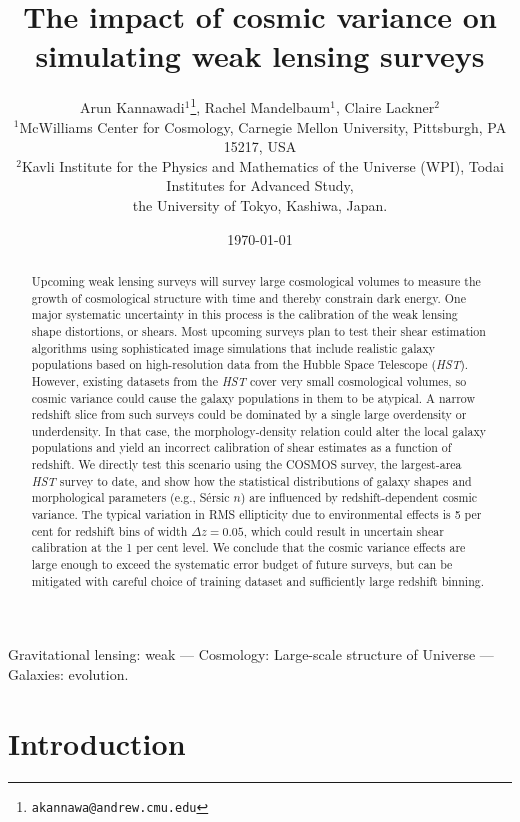 \documentclass[twocolumn,useAMS,usenatbib]{mn2e}
\title[Cosmic variance in simulations]{The impact of cosmic variance on simulating weak lensing surveys}
\author[Kannawadi et al.]
{Arun Kannawadi$^1$\thanks{\tt akannawa@andrew.cmu.edu}, 
Rachel Mandelbaum$^1$,
Claire Lackner$^2$
\\$^1$McWilliams Center for Cosmology, Carnegie Mellon University, Pittsburgh, PA 15217, USA
\\$^2$Kavli Institute for the Physics and Mathematics of the Universe (WPI), Todai Institutes for Advanced Study,\\ the University of Tokyo, Kashiwa, Japan.
}
\date{\today}
\begin{document}

\maketitle

\begin{abstract}
Upcoming weak lensing surveys will survey large cosmological volumes to measure the growth of cosmological structure with time and
thereby constrain dark energy.  One major systematic uncertainty in
this process is the calibration of the weak lensing shape distortions,
or shears.  Most upcoming surveys plan to test their shear
estimation algorithms using sophisticated image simulations that
include 
realistic galaxy populations based on high-resolution data from the
Hubble Space Telescope ({\em HST}).  However, existing datasets
from the {\em HST} cover very small cosmological volumes, so cosmic variance could cause the galaxy populations in them
to be atypical. A narrow redshift slice from such surveys could be dominated by a single large overdensity or underdensity.  In that case, the
morphology-density relation could alter the local galaxy
populations and yield an incorrect calibration of shear estimates as a function of redshift. We directly test this scenario using the COSMOS survey, the largest-area {\em HST} survey to date, and show how the
statistical distributions of galaxy shapes and
morphological parameters (e.g., S\'{e}rsic $n$)
are influenced by redshift-dependent cosmic variance. 
The typical variation in RMS ellipticity due to environmental effects is 5 per cent for redshift bins of width $\Delta z=0.05$, which could result in uncertain shear calibration at the 1 per cent level. We conclude that the cosmic variance effects are large enough to exceed the systematic error budget of future surveys, but can be mitigated with careful choice of training dataset and sufficiently large redshift binning.
\end{abstract}

\begin{keywords}
 Gravitational lensing: weak --- Cosmology: Large-scale structure of Universe --- Galaxies: evolution.
\end{keywords}


\section{Introduction}
\label{S:intro}
\end{document}
